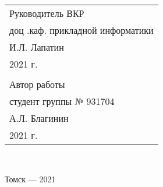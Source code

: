 \begin{flushright}\linespread{0.9}
	\normalsize{ 
		\begin{tabular}{@{}l@{}}
		Руководитель ВКР\\
		 доц .каф. прикладной информатики\\ \underline{\hspace{2cm}} И.Л. Лапатин\\
		 \textquote{\underline{\hspace{0.7cm}}}\underline{\hspace{2cm}}2021 г.\\
		  \break
		  \\
		Автор работы\\
		  студент группы № 931704\\ \underline{\hspace{2cm}} А.Л. Благинин\\
		 \textquote{\underline{\hspace{0.7cm}}}\underline{\hspace{2cm}}2021 г.
		\end{tabular}	
	}\\

\end{flushright}
	\hfill \break
	\hfill \break
	\begin{center} Томск --- 2021 \end{center}
	\thispagestyle{empty} %
	\clearpage
